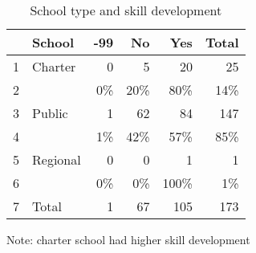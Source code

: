 \documentclass[12pt]{article}
\begin{document}
\begin{table}[ht]
\caption{School type and skill development} 
\centering
\begin{tabular}{llrrrr}
  \hline
 & School & -99 & No & Yes & Total \\ 
  \hline
1 & Charter & 0 & 5 & 20 & 25 \\ 
  2 &   & 0\% & 20\% & 80\% & 14\% \\ 
  3 & Public & 1 & 62 & 84 & 147 \\ 
  4 &   & 1\% & 42\% & 57\% & 85\% \\ 
  5 & Regional & 0 & 0 & 1 & 1 \\ 
  6 &   & 0\% & 0\% & 100\% & 1\% \\ 
  7 & Total & 1 & 67 & 105 & 173 \\ 
   \hline
\end{tabular}
\begin{tablenotes}
      \small
      \item Note: charter school had higher skill development 
    \end{tablenotes}
\end{table}
\end{document}
